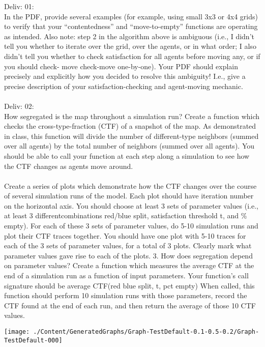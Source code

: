 \documentclass[letterpaper]{article}
\begin{document}
Deliv: 01:\\
In the PDF, provide several examples (for example, using small 3x3 or 4x4 grids) to verify that your “contentedness” and “move-to-empty” functions are operating as intended. Also note: step 2 in the algorithm above is ambiguous (i.e., I didn’t tell you whether to iterate over the grid, over the agents, or in what order; I also didn’t tell you whether to check satisfaction for all agents before moving any, or if you should check- move check-move one-by-one). Your PDF should explain precisely and explicitly how you decided to resolve this ambiguity! I.e., give a precise description of your satisfaction-checking and agent-moving mechanic.\\ \\
Deliv: 02:\\
How segregated is the map throughout a simulation run? Create a function which checks the cross-type-fraction (CTF) of a snapshot of the map. As demonstrated in class, this function will divide the number of different-type neighbors (summed over all agents) by the total number of neighbors (summed over all agents). You should be able to call your function at each step along a simulation to see how the CTF changes as agents move around.\\\\
Create a series of plots which demonstrate how the CTF changes over the course of several simulation runs of the model. Each plot should have iteration number on the horizontal axis. You should choose at least 3 sets of parameter values (i.e., at least 3 differentcombinations red/blue split, satisfaction threshold t, and \% empty). For each of these 3 sets of parameter values, do 5-10 simulation runs and plot their CTF traces together. You should have one plot with 5-10 traces for each of the 3 sets of parameter values, for a total of 3 plots. Clearly mark what parameter values gave rise to each of the plots. 3. How does segregation depend on parameter values? Create a function which measures the average CTF at the end of a simulation run as a function of input parameters. Your function’s call signature should be average CTF(red blue split, t, pct empty) When called, this function should perform 10 simulation runs with those parameters, record the CTF found at the end of each run, and then return the average of those 10 CTF values.  

\begin{center}
\texttt{[image: ./Content/GeneratedGraphs/Graph-TestDefault-0.1-0.5-0.2/Graph-TestDefault-000]}
\end{center}
\end{document}
